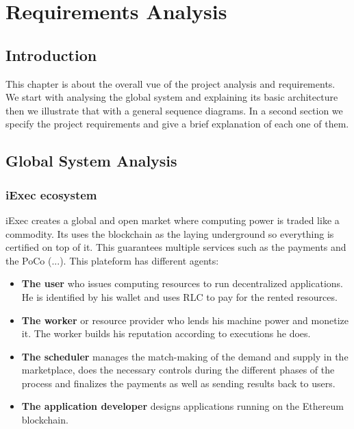 

\chapter{Requirements Analysis}

\section{Introduction}
    This chapter is about the overall vue of the project analysis and requirements.
    We start with analysing the global system and explaining its basic architecture then we illustrate that with a general
    sequence diagrams. In a second section we specify the project requirements and give a brief explanation of each one of
    them.

\section{Global System Analysis}

    \subsection{iExec ecosystem}
        iExec creates a global and open market where computing power is traded like a commodity. Its uses the blockchain
        as the laying underground so everything is certified on top of it. This guarantees multiple services such as
        the payments and the PoCo (...).
        This plateform has different agents\cite{iexec-architecture}:
        \begin{itemize}
            \item \textbf{The user} who issues computing resources to run decentralized applications. He is identified by
            his wallet and uses RLC to pay for the rented resources.

            \item \textbf{The worker} or resource provider who lends his machine power and monetize it. The worker builds his
            reputation according to executions he does.
            
            \item \textbf{The scheduler} manages the match-making of the demand and supply in the marketplace, does the
            necessary controls during the different phases of the process and finalizes the payments as well as sending
            results back to users.

            \item \textbf{The application developer} designs applications running on the Ethereum\cite{ethereum} blockchain.
        \end{itemize}

